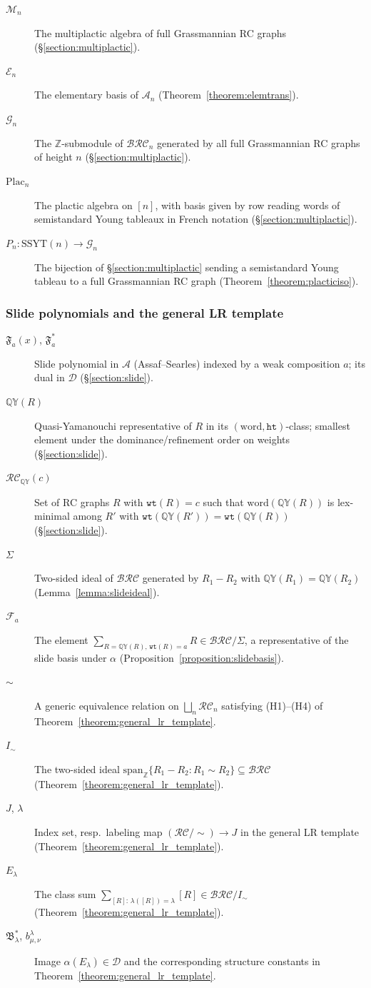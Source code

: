 \documentclass{amsart}
\theoremstyle{definition}
\theoremstyle{remark}
\numberwithin{equation}{subsection}
\newcommand{\wtt}{\mathtt{wt}}
\newcommand{\QY}{\ensuremath{\mathbb{QY}}}
\newcommand{\grass}{\mathcal{G}}
\newcommand{\plac}{\mathrm{Plac}}
\newcommand{\hr}{\mathtt{ht}}
\newcommand{\BRC}{\mathcal{BRC}}
\newcommand{\RC}{\mathcal{RC}}
\newcommand{\coma}{\mathcal{A}}
\newcommand{\dcoma}{\mathcal{D}}
\begin{document}
\begin{description}
\item[$\mathcal{M}_n$] The multiplactic algebra of full Grassmannian RC graphs (\S\ref{section:multiplactic}).
\item[$\mathcal{E}_n$] The elementary basis of $\coma_n$ (Theorem~\ref{theorem:elemtrans}).
\item[$\grass_n$] The $\mathbb{Z}$-submodule of $\BRC_n$ generated by all full Grassmannian RC graphs of height $n$ (\S\ref{section:multiplactic}).
\item[$\plac_n$] The plactic algebra on $[n]$, with basis given by row reading words of semistandard Young tableaux in French notation (\S\ref{section:multiplactic}).
\item[$P_n:\mathrm{SSYT}(n)\to\grass_n$] The bijection of \S\ref{section:multiplactic} sending a semistandard Young tableau to a full Grassmannian RC graph (Theorem~\ref{theorem:placticiso}).
\end{description}

\subsubsection*{Slide polynomials and the general LR template}
\begin{description}
\item[$\mathfrak{F}_a(x)$, $\mathfrak{F}_a^*$] Slide polynomial in $\coma$ (Assaf--Searles) indexed by a weak composition $a$; its dual in $\dcoma$ (\S\ref{section:slide}).
\item[$\QY(R)$] Quasi-Yamanouchi representative of $R$ in its $(\mathrm{word},\hr)$-class; smallest element under the dominance/refinement order on weights (\S\ref{section:slide}).
\item[$\RC_\QY(c)$] Set of RC graphs $R$ with $\wtt(R)=c$ such that $\mathrm{word}(\QY(R))$ is lex-minimal among $R'$ with $\wtt(\QY(R'))=\wtt(\QY(R))$ (\S\ref{section:slide}).
\item[$\Sigma$] Two-sided ideal of $\BRC$ generated by $R_1-R_2$ with $\QY(R_1)=\QY(R_2)$ (Lemma~\ref{lemma:slideideal}).
\item[$\mathcal{F}_a$] The element $\sum_{R=\QY(R),\,\wtt(R)=a} R\in\BRC/\Sigma$, a representative of the slide basis under $\alpha$ (Proposition~\ref{proposition:slidebasis}).
\item[$\sim$] A generic equivalence relation on $\bigsqcup_n\RC_n$ satisfying (H1)--(H4) of Theorem~\ref{theorem:general_lr_template}.
\item[$I_\sim$] The two-sided ideal $\mathrm{span}_{\mathbb{Z}}\{R_1-R_2:R_1\sim R_2\}\subseteq\BRC$ (Theorem~\ref{theorem:general_lr_template}).
\item[$J$, $\lambda$] Index set, resp.\ labeling map $(\RC/\!\sim)\to J$ in the general LR template (Theorem~\ref{theorem:general_lr_template}).
\item[$E_\lambda$] The class sum $\sum_{[R]:\,\lambda([R])=\lambda}[R]\in\BRC/I_\sim$ (Theorem~\ref{theorem:general_lr_template}).
\item[$\mathfrak{B}_\lambda^*$, $b_{\mu,\nu}^\lambda$] Image $\alpha(E_\lambda)\in\dcoma$ and the corresponding structure constants in Theorem~\ref{theorem:general_lr_template}.
\end{description}
\end{document}

